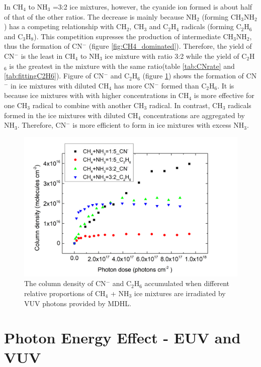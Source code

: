In CH$_4$ to NH$_3$ =3:2 ice mixtures, however, the cyanide ion formed is about half of that of the other ratios. The decrease is mainly because NH$_2$ (forming CH$_3$NH$_2$) has a competing relationship with CH$_2$, CH$_3$ and C$_2$H$_4$ radicals (forming C$_2$H$_6$ and C$_3$H$_8$). This competition supresses the production of intermediate CH$_3$NH$_2$, thus the formation of CN$^-$ (figure \ref{fig:CH4_dominated}). Therefore, the yield of CN$^-$ is the least in CH$_4$ to NH$_3$ ice mixture with ratio 3:2 while the yield of C$_2$H$_6$ is the greatest in the mixture with the same ratio(table \ref{tab:CNrate} and \ref{tab:fittingC2H6}). Figure of CN$^-$ and C$_2$H$_6$ (figure \ref{fig:C2H6_CN_comparison}) shows the formation of CN$^-$ in ice mixtures with diluted CH$_4$ has more CN$^-$ formed than C$_2$H$_6$. It is because ice mixtures with with higher concentrations in CH$_4$ is more effective for one CH$_3$ radical to combine with another CH$_3$ radical. In contrast, CH$_3$ radicals formed in the ice mixtures with diluted CH$_4$ concentrations are aggregated by NH$_3$. Therefore, CN$^-$ is more efficient to form in ice mixtures with excess NH$_3$.\\


\begin{figure}
\centering
\includegraphics[width=\textwidth]{figures/chapter3/C2H6_CN_comparison.png}
\caption{The column density of CN$^-$ and C$_2$H$_6$ accumulated when different relative proportions of CH$_4$ + NH$_3$ ice mixtures are irradiated by VUV photons provided by MDHL.}
\label{fig:C2H6_CN_comparison}
\end{figure}


\section{Photon Energy Effect - EUV and VUV} %

